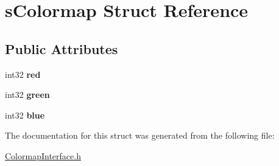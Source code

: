\hypertarget{structsColormap}{
\section{sColormap Struct Reference}
\label{structsColormap}
}
\subsection*{Public Attributes}
\begin{DoxyCompactItemize}
\item 
\hypertarget{structsColormap_a20802856b3b681677e1a7dae2a600f26}{
int32 {\bfseries red}}
\label{structsColormap_a20802856b3b681677e1a7dae2a600f26}

\item 
\hypertarget{structsColormap_abcd871229d043dd623922fa65873837c}{
int32 {\bfseries green}}
\label{structsColormap_abcd871229d043dd623922fa65873837c}

\item 
\hypertarget{structsColormap_ac99f9b24b74d39acd2ede6e3b2aaab6f}{
int32 {\bfseries blue}}
\label{structsColormap_ac99f9b24b74d39acd2ede6e3b2aaab6f}

\end{DoxyCompactItemize}


The documentation for this struct was generated from the following file:\begin{DoxyCompactItemize}
\item 
\hyperlink{ColormapInterface_8h}{ColormapInterface.h}\end{DoxyCompactItemize}
